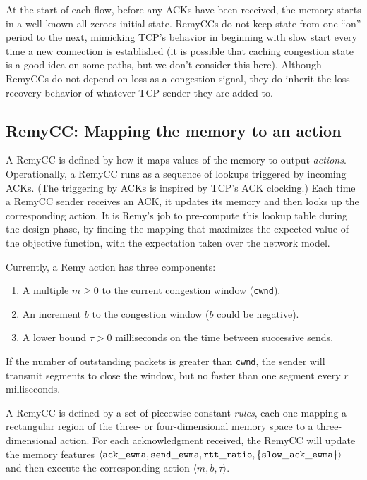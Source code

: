 
At the start of each flow, before any ACKs have been received, the
memory starts in a well-known all-zeroes initial state. RemyCCs do not
keep state from one ``on'' period to the next, mimicking TCP's
behavior in beginning with slow start every time a new connection is
established (it is possible that caching congestion state is a good
idea on some paths, but we don't consider this here). Although RemyCCs
do not depend on loss as a congestion signal, they do inherit the
loss-recovery behavior of whatever TCP sender they are added to.

\subsection{RemyCC: Mapping the memory to an action}

A RemyCC is defined by how it maps values of the memory to output
\emph{actions}. Operationally, a RemyCC runs as a sequence of lookups
triggered by incoming ACKs. (The triggering by ACKs is
inspired by TCP's ACK clocking.)  Each time a RemyCC sender receives
an ACK, it updates its memory and then looks up the corresponding
action. It is Remy's job to pre-compute this lookup table during the design
phase, by finding the mapping that maximizes the expected value of the
objective function, with the expectation taken over the network model.

Currently, a Remy action has three components:

\begin{enumerate}

\item A multiple $m \geq 0$ to the current congestion window ({\tt cwnd}).

\item An increment $b$ to the congestion window ($b$ could be negative).

\item A lower bound $\tau > 0$ milliseconds on the time between
  successive sends.

\end{enumerate}

If the number of outstanding packets is greater than {\tt cwnd}, the
sender will transmit segments to close the window, but no faster than
one segment every $r$ milliseconds.

A RemyCC is defined by a set of piecewise-constant \emph{rules}, each
one mapping a rectangular region of the three- or four-dimensional
memory space to a three-dimensional action. For each acknowledgment
received, the RemyCC will update the memory features $\langle {\tt
  ack\_ewma}, {\tt send\_ewma}, {\tt rtt\_ratio}, \{ {\tt
  slow\_ack\_ewma} \} \rangle$ and then execute the corresponding action
$\langle m, b, \tau \rangle$.

